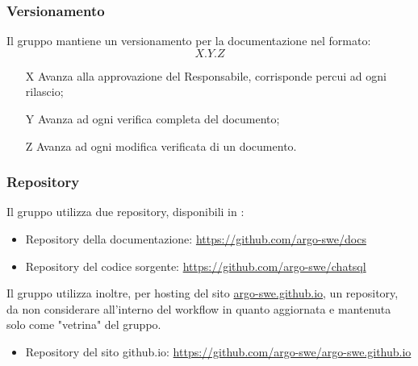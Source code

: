 \begin{itemize}
\subsubsection{Versionamento}
Il gruppo mantiene un versionamento per la documentazione nel formato:
\[ X.Y.Z \]
\begin{itemize}
  \item[X] Avanza alla approvazione del Responsabile, corrisponde percui ad ogni rilascio;
  \item[Y] Avanza ad ogni verifica completa del documento;
  \item[Z] Avanza ad ogni modifica verificata di un documento.
\end{itemize}

\subsubsection{Repository}
Il gruppo utilizza due repository, disponibili in :
\begin{itemize}
  \item Repository della documentazione: \href{https://github.com/argo-swe/docs}{https://github.com/argo-swe/docs}
  \item Repository del codice sorgente: \href{https://github.com/argo-swe/chatsql}{https://github.com/argo-swe/chatsql}
\end{itemize}
Il gruppo utilizza inoltre, per hosting del sito \href{https://argo-swe.github.io}{argo-swe.github.io}, un repository, da non considerare all'interno del workflow in quanto aggiornata e mantenuta solo come "vetrina" del gruppo.
\begin{itemize}
  \item Repository del sito github.io: \href{https://github.com/argo-swe/argo-swe.github.io}{https://github.com/argo-swe/argo-swe.github.io}
\end{itemize}


\end{itemize}
